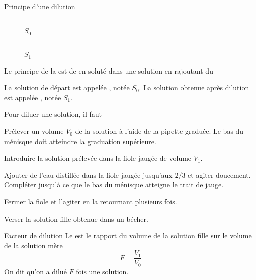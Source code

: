 \begin{doc}{Principe d'une dilution}
  \begin{wrapfigure}[5]{r}{0.5\linewidth}
    \vspace*{-16pt}
    \centering
    \begin{multicols}{4}
     \\[0pt]
    \footnotesize{$S_0$}
    
    
    
     \\[0pt]
    \footnotesize{$S_1$}
    \end{multicols}
  \end{wrapfigure}
  \vAligne{-40pt}
  
  \begin{importants}
    Le principe de la  est de  en soluté dans une solution en rajoutant du 
  \end{importants}
  La solution de départ est appelée , notée $S_0$.
  La solution obtenue après dilution est appelée , notée $S_1$.

  Pour diluer une solution, il faut
  \begin{protocole}
    \item Prélever un volume $V_0$ de la solution à l'aide de la pipette graduée.
    Le bas du ménisque doit atteindre la graduation supérieure.
    \item Introduire la solution prélevée dans la fiole jaugée de volume $V_1$.
    \item Ajouter de l'eau distillée dans la fiole jaugée jusqu'aux $2/3$ et agiter doucement. Compléter jusqu'à ce que le bas du ménisque atteigne le trait de jauge.
    \item Fermer la fiole et l'agiter en la retournant plusieurs fois.
    \item Verser la solution fille obtenue dans un bécher.
  \end{protocole}
\end{doc}


\begin{doc}{Facteur de dilution}
  Le  est le rapport du volume de la solution fille sur le volume de la solution mère
  \begin{equation*}
    F = \frac{V_\text{1}}{V_\text{0}}
  \end{equation*}
  On dit qu'on a dilué $F$ fois une solution.
\end{doc}

